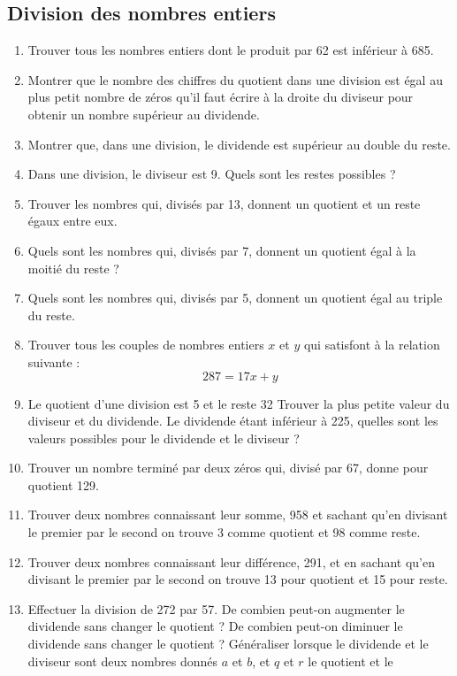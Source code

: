 \documentclass[12 pt]{extarticle}
\theoremstyle{plain}
\begin{document}
 
 \subsection{Division des nombres entiers}
 \begin{enumerate}
 \item Trouver tous les nombres entiers dont le 
 produit par 62 est inférieur à 685. 
 \item Montrer que le nombre des chiffres du quotient
 dans une division est égal au plus petit nombre de zéros qu'il 
 faut écrire à la droite du diviseur pour 
 obtenir un nombre supérieur au dividende.
 \item Montrer que, dans une division, le dividende est
 supérieur au double du reste. 
 \item Dans une division, le diviseur est 9. 
 Quels sont les restes possibles ? 
 \item Trouver les nombres qui, divisés par 13, 
 donnent un quotient et un reste égaux entre eux. 
 \item Quels sont les nombres qui, divisés par 7, 
 donnent un quotient égal à la moitié du reste ? 
 \item Quels sont les nombres qui, divisés par 5, 
 donnent un quotient égal au triple du reste. 
 \item Trouver tous les couples de nombres entiers $x$
 et $y$ qui satisfont à la relation suivante :
 \[ 287 = 17x + y\]
 \item Le quotient d'une division est 5 et le reste 32
 Trouver la plus petite valeur du diviseur et du dividende. Le dividende étant inférieur à 225, quelles 
 sont les valeurs possibles pour le dividende et le
 diviseur ? 
 \item Trouver un nombre terminé par deux zéros qui,
 divisé par 67, donne pour quotient 129. 
 \item Trouver deux nombres connaissant leur somme, 
 958 et sachant qu'en divisant le premier par le second on trouve 3 comme quotient et 98 comme reste.
 \item Trouver deux nombres connaissant leur différence, 291, et en sachant qu'en divisant le 
 premier par le second on trouve 13 pour quotient et 15 pour reste. 
 \item Effectuer la division de 272 par 57. 
 De combien peut-on augmenter le dividende sans 
 changer le quotient ? De combien peut-on diminuer le 
 dividende sans changer le quotient ? Généraliser lorsque le dividende et le diviseur sont deux nombres
 donnés $a$ et $b$, et $q$ et $r$ le quotient et le 

\end{enumerate}
\end{document}
